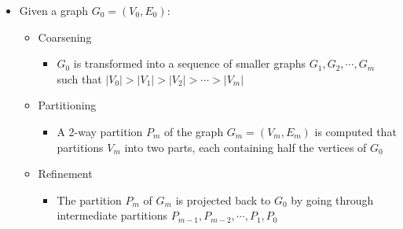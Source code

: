 \documentclass[abstract=on,9pt,twocolumn]{scrartcl}
\begin{document}
\begin{itemize}
  \item Given a graph $G_0 = (V_0,E_0)$:
  \begin{itemize}    
    \item Coarsening
    \begin{itemize}
      \item $G_0$ is transformed into a sequence of smaller graphs $G_1,G_2,\cdots,G_m$ such that $|V_0|>|V_1|>|V_2|>\cdots>|V_m|$
    \end{itemize}
    \item Partitioning 
    \begin{itemize}
      \item A 2-way partition $P_m$ of the graph $G_m = (V_m,E_m)$ is computed that partitions $V_m$ into two parts, each containing half the vertices of $G_0$
    \end{itemize}
    \item Refinement
    \begin{itemize}
      \item The partition $P_m$ of $G_m$ is projected back to $G_0$ by going through intermediate partitions $P_{m-1}, P_{m-2},\cdots,P_1,P_0 $
    \end{itemize}
  \end{itemize}
\end{itemize}


  



\end{document}
